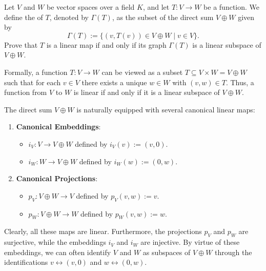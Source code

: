 \begin{exercise}
\label{exc:graph_of_linear_map}
Let $V$ and $W$ be vector spaces over a field $K$, and let $T \colon V \to W$ be a function. We define the  of $T$, denoted by $\Gamma(T)$, as the subset of the direct sum $V \oplus W$ given by
\[
\Gamma(T) := \{(v, T(v)) \in V \oplus W \mid v \in V\}.
\]
Prove that $T$ is a linear map if and only if its graph $\Gamma(T)$ is a linear subspace of $V \oplus W$.
\begin{remark}
Formally, a function $T \colon V \to W$ can be viewed as a subset $T \subseteq V \times W = V \oplus W$ such that for each $v \in V$ there exists a unique $w \in W$ with $(v, w) \in T$. Thus, a function from $V$ to $W$ is linear if and only if it is a linear subspace of $V \oplus W$.
\end{remark}
\end{exercise}


\begin{remark}
  The direct sum $V \oplus W$ is naturally equipped with several canonical linear maps:
  \begin{enumerate}
    \item \textbf{Canonical Embeddings}:
    \begin{itemize}
      \item $i_V \colon V \to V \oplus W$ defined by $i_V(v) := (v, 0)$.
      \item $i_W \colon W \to V \oplus W$ defined by $i_W(w) := (0, w)$.
    \end{itemize}
    \item \textbf{Canonical Projections}:
    \begin{itemize}
      \item $p_V \colon V \oplus W \to V$ defined by $p_V(v, w) := v$.
      \item $p_W \colon V \oplus W \to W$ defined by $p_W(v, w) := w$.
    \end{itemize}
  \end{enumerate}
  Clearly, all these maps are linear. Furthermore, the projections $p_V$ and $p_W$ are surjective, while the embeddings $i_V$ and $i_W$ are injective. By virtue of these embeddings, we can often identify $V$ and $W$ as subspaces of $V \oplus W$ through the identifications $v \leftrightarrow (v, 0)$ and $w \leftrightarrow (0, w)$.
\end{remark}

